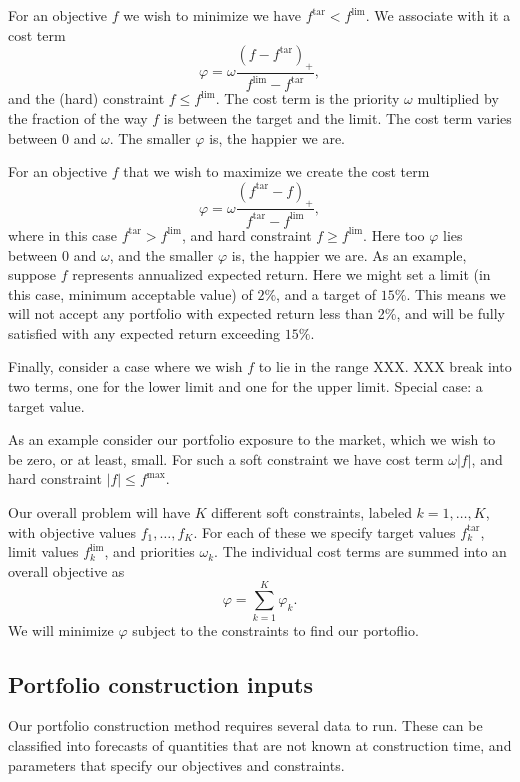 \documentclass[12pt]{article}
\begin{document}
For an objective $f$ we wish to minimize we have $f^\mathrm{tar} < f^\mathrm{lim}$.
We associate with it a cost term
\[
\varphi = \omega \frac{(f-f^\mathrm{tar})_+}{f^\mathrm{lim}-f^\mathrm{tar}},
\]
and the (hard) constraint $f \leq f^\mathrm{lim}$.
The cost term is the priority $\omega$ multiplied by the fraction 
of the way $f$ is between the target and the limit.
The cost term varies between $0$ and $\omega$.
The smaller $\varphi$ is, the happier we are.

For an objective $f$ that we wish to maximize we create the cost term
\[
\varphi = \omega \frac{(f^\mathrm{tar}-f)_+}{f^\mathrm{tar}-f^\mathrm{lim}},
\]
where in this case $f^\mathrm{tar} > f^\mathrm{lim}$, and hard constraint
$f \geq f^\mathrm{lim}$.
Here too $\varphi$ lies between $0$ and $\omega$,
and the smaller $\varphi$ is, the happier we are.
As an example, suppose $f$ represents annualized expected return.  
Here we might set a limit 
(in this case, minimum acceptable value) of $2\%$, and a target of $15\%$.
This means we will not accept any portfolio with expected return less than 2\%,
and will be fully satisfied with any expected return exceeding $15\%$.

Finally, consider a case where we wish $f$ to lie in the range XXX.
XXX break into two terms, one for the lower limit and one for the upper limit.
Special case: a target value.

As an example consider our portfolio exposure to the market, which we wish to be
zero, or at least, small.  For such a soft constraint we have cost term
$\omega |f|$, and hard constraint $|f|\leq f^\mathrm{max}$.

Our overall problem will have
$K$ different soft constraints, labeled $k=1, \ldots, K$,
with objective values $f_1, \ldots, f_K$.
For each of these we specify target values $f^\mathrm{tar}_k$, 
limit values $f^\mathrm{lim}_k$, and priorities $\omega_k$.
The individual cost terms are summed into an overall objective as
\[
\varphi = \sum_{k=1}^K \varphi_k.
\]
We will minimize $\varphi$ subject to the constraints to find our portoflio.

\subsection{Portfolio construction inputs}
Our portfolio construction method requires several data to run.  These 
can be classified into forecasts of quantities that are not known at construction time,
and parameters that specify our objectives and constraints.
\end{document}
